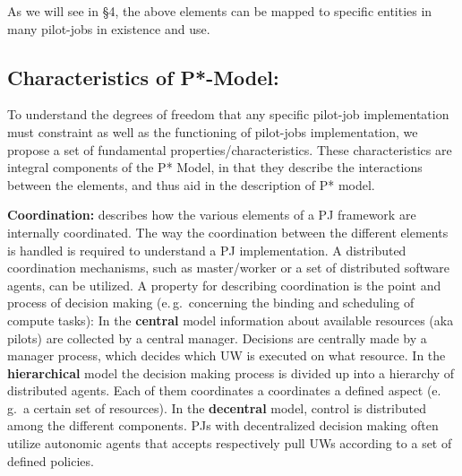 \documentclass[conference,final]{IEEEtran}
\newcommand{\upp}{\vspace*{-0.5em}}
\begin{document}
As we will see in \S4, the above elements can be mapped to specific
entities in many pilot-jobs in existence and use.

 

% 
% 


\subsection{Characteristics of P*-Model:\upp\upp}
\label{sec:p_star_elements}

To understand the degrees of freedom that any specific pilot-job
implementation must constraint as well as the functioning of
pilot-jobs implementation, we propose a set of fundamental
properties/characteristics. These characteristics are integral
components of the P* Model, in that they describe the interactions
between the elements, and thus aid in the description of P*
model. 


\textbf{Coordination:} describes how the various elements of a PJ framework are
internally coordinated. The way the coordination between the different elements
is handled is required to understand a PJ implementation. A distributed
coordination mechanisms, such as master/worker or a set of distributed software
agents, can be utilized. A property for describing coordination is the point and
process of decision making (e.\,g.\ concerning the binding and scheduling of
compute tasks): In the \textbf{central} model information about available
resources (aka pilots) are collected by a central manager. Decisions are
centrally made by a manager process, which decides which UW is executed on what
resource. In the \textbf{hierarchical} model the decision making process is
divided up into a hierarchy of distributed agents. Each of them coordinates a
coordinates a defined aspect (e.\,g.\ a certain set of resources). In the
\textbf{decentral} model, control is distributed among the different components.
PJs with decentralized decision making often utilize autonomic agents that
accepts respectively pull UWs according to a set of defined policies.
\end{document}
